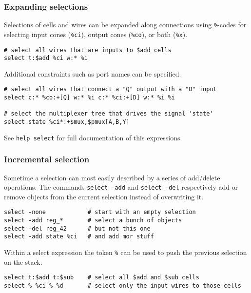 \subsubsection{Expanding selections}

\begin{frame}[fragile]{\subsubsecname}
Selections of cells and wires can be expanded along connections using {\tt \%}-codes
for selecting input cones ({\tt \%ci}), output cones ({\tt \%co}), or both ({\tt \%x}).

\medskip
\begin{lstlisting}[xleftmargin=0.5cm, basicstyle=\ttfamily\fontsize{8pt}{10pt}\selectfont, language=ys]
# select all wires that are inputs to $add cells
select t:$add %ci w:* %i
\end{lstlisting}

\bigskip
Additional constraints such as port names can be specified.

\medskip
\begin{lstlisting}[xleftmargin=0.5cm, basicstyle=\ttfamily\fontsize{8pt}{10pt}\selectfont, language=ys]
# select all wires that connect a "Q" output with a "D" input
select c:* %co:+[Q] w:* %i c:* %ci:+[D] w:* %i %i

# select the multiplexer tree that drives the signal 'state'
select state %ci*:+$mux,$pmux[A,B,Y]
\end{lstlisting}

\bigskip
See {\tt help select} for full documentation of this expressions.
\end{frame}

\subsubsection{Incremental selection}

\begin{frame}[fragile]{\subsubsecname}
Sometime a selection can most easily described by a series of add/delete operations.
The commands {\tt select -add} and {\tt select -del} respectively add or remove objects
from the current selection instead of overwriting it.

\medskip
\begin{lstlisting}[xleftmargin=0.5cm, basicstyle=\ttfamily\fontsize{8pt}{10pt}\selectfont, language=ys]
select -none            # start with an empty selection
select -add reg_*       # select a bunch of objects
select -del reg_42      # but not this one
select -add state %ci   # and add mor stuff
\end{lstlisting}

\bigskip
Within a select expression the token {\tt \%} can be used to push the previous selection
on the stack.

\medskip
\begin{lstlisting}[xleftmargin=0.5cm, basicstyle=\ttfamily\fontsize{8pt}{10pt}\selectfont, language=ys]
select t:$add t:$sub    # select all $add and $sub cells
select % %ci % %d       # select only the input wires to those cells
\end{lstlisting}
\end{frame}

